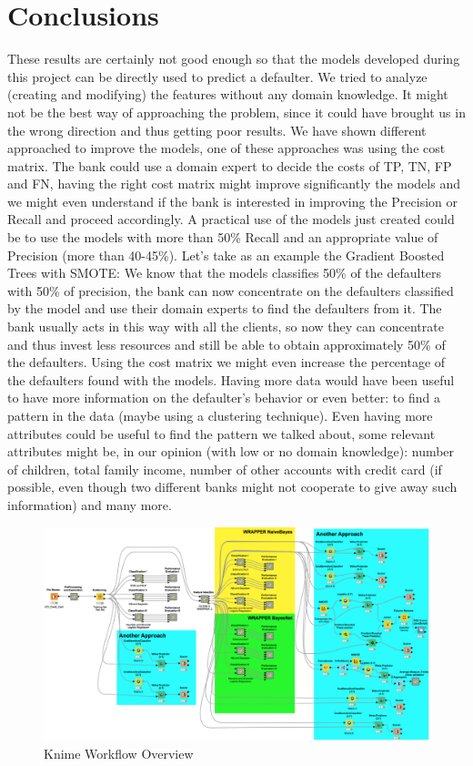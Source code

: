 \documentclass[fleqn,10pt]{SelfArx} %
\begin{document}
\section{Conclusions}
These results are certainly not good enough so that the models developed during this project can be directly used to predict a defaulter. 
We tried to analyze (creating and modifying) the features without any domain knowledge. 
It might not be the best way of approaching the problem, since it could have brought us in the wrong direction and thus getting poor results.\newline
We have shown different approached to improve the models, one of these approaches was using the cost matrix. The bank could use a domain expert to decide the costs of TP, TN, FP and FN, having the right cost matrix might improve significantly the models and we might even understand if the bank is interested in improving the Precision or Recall and proceed accordingly.\newline
A practical use of the models just created could be to use the models with more than 50\% Recall and an appropriate value of Precision (more than 40-45\%). 
Let's take as an example the Gradient Boosted Trees with SMOTE: We know that the models classifies 50\% of the defaulters with 50\% of precision, the bank can now concentrate on the defaulters classified by the model and use their domain experts to find the defaulters from it. 
The bank usually acts in this way with all the clients, so now they can concentrate and thus invest less resources and still be able to obtain approximately 50\% of the defaulters.
Using the cost matrix we might even increase the percentage of the defaulters found with the models.\newline
Having more data would have been useful to have more information on the defaulter's behavior or even better: to find a pattern in the data (maybe using a clustering technique). Even having more attributes could be useful to find the pattern we talked about, some relevant attributes might be, in our opinion (with low or no domain knowledge): number of children, total family income, number of other accounts with credit card (if possible, even though two different banks might not cooperate to give away such information) and many more.


	\begin{figure}[ht!]
		\centering
		\includegraphics[width=\linewidth]{Workflow.png}
		\caption{Knime Workflow Overview}
	\end{figure}
\end{document}
